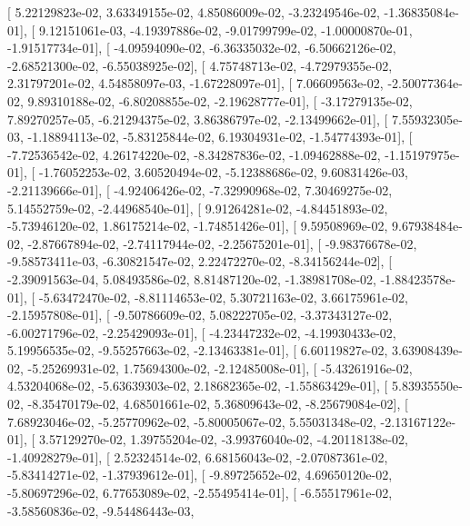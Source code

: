 \documentclass{article}
\begin{document}
       [  5.22129823e-02,   3.63349155e-02,   4.85086009e-02,
         -3.23249546e-02,  -1.36835084e-01],
       [  9.12151061e-03,  -4.19397886e-02,  -9.01799799e-02,
         -1.00000870e-01,  -1.91517734e-01],
       [ -4.09594090e-02,  -6.36335032e-02,  -6.50662126e-02,
         -2.68521300e-02,  -6.55038925e-02],
       [  4.75748713e-02,  -4.72979355e-02,   2.31797201e-02,
          4.54858097e-03,  -1.67228097e-01],
       [  7.06609563e-02,  -2.50077364e-02,   9.89310188e-02,
         -6.80208855e-02,  -2.19628777e-01],
       [ -3.17279135e-02,   7.89270257e-05,  -6.21294375e-02,
          3.86386797e-02,  -2.13499662e-01],
       [  7.55932305e-03,  -1.18894113e-02,  -5.83125844e-02,
          6.19304931e-02,  -1.54774393e-01],
       [ -7.72536542e-02,   4.26174220e-02,  -8.34287836e-02,
         -1.09462888e-02,  -1.15197975e-01],
       [ -1.76052253e-02,   3.60520494e-02,  -5.12388686e-02,
          9.60831426e-03,  -2.21139666e-01],
       [ -4.92406426e-02,  -7.32990968e-02,   7.30469275e-02,
          5.14552759e-02,  -2.44968540e-01],
       [  9.91264281e-02,  -4.84451893e-02,  -5.73946120e-02,
          1.86175214e-02,  -1.74851426e-01],
       [  9.59508969e-02,   9.67938484e-02,  -2.87667894e-02,
         -2.74117944e-02,  -2.25675201e-01],
       [ -9.98376678e-02,  -9.58573411e-03,  -6.30821547e-02,
          2.22472270e-02,  -8.34156244e-02],
       [ -2.39091563e-04,   5.08493586e-02,   8.81487120e-02,
         -1.38981708e-02,  -1.88423578e-01],
       [ -5.63472470e-02,  -8.81114653e-02,   5.30721163e-02,
          3.66175961e-02,  -2.15957808e-01],
       [ -9.50786609e-02,   5.08222705e-02,  -3.37343127e-02,
         -6.00271796e-02,  -2.25429093e-01],
       [ -4.23447232e-02,  -4.19930433e-02,   5.19956535e-02,
         -9.55257663e-02,  -2.13463381e-01],
       [  6.60119827e-02,   3.63908439e-02,  -5.25269931e-02,
          1.75694300e-02,  -2.12485008e-01],
       [ -5.43261916e-02,   4.53204068e-02,  -5.63639303e-02,
          2.18682365e-02,  -1.55863429e-01],
       [  5.83935550e-02,  -8.35470179e-02,   4.68501661e-02,
          5.36809643e-02,  -8.25679084e-02],
       [  7.68923046e-02,  -5.25770962e-02,  -5.80005067e-02,
          5.55031348e-02,  -2.13167122e-01],
       [  3.57129270e-02,   1.39755204e-02,  -3.99376040e-02,
         -4.20118138e-02,  -1.40928279e-01],
       [  2.52324514e-02,   6.68156043e-02,  -2.07087361e-02,
         -5.83414271e-02,  -1.37939612e-01],
       [ -9.89725652e-02,   4.69650120e-02,  -5.80697296e-02,
          6.77653089e-02,  -2.55495414e-01],
       [ -6.55517961e-02,  -3.58560836e-02,  -9.54486443e-03,
\end{document}
